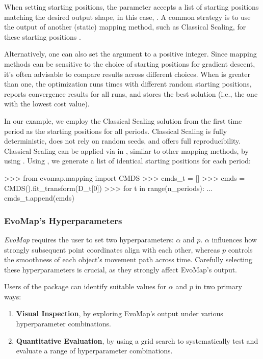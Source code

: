 \documentclass[article]{jss}
\begin{document}
When setting starting positions, the  parameter accepts a list of starting positions matching
 the desired output shape, in this case, . A common strategy is to use the output of 
 another (static) mapping method, such as Classical Scaling, for these starting positions \citep{DeLeeuw+Mair:2009}.

Alternatively, one can also set the  argument to a positive integer. Since mapping methods 
can be sensitive to the choice of starting positions for gradient descent, it's often advisable to compare results
across different choices. When  is greater than one, the optimization runs  times with 
different random starting positions, reports convergence results for all runs, and stores the best solution 
(i.e., the one with the lowest cost value).

In our example, we employ the Classical Scaling solution from the first time period as the starting positions for all 
periods. Classical Scaling is fully deterministic, does not rely on random seeds, and offers full reproducibility. 
Classical Scaling can be applied via  in , similar to other 
mapping methods, by using . Using , we generate a list of identical starting positions 
for each period:

\begin{CodeChunk}
\begin{CodeInput}
>>> from evomap.mapping import CMDS
>>> cmds_t = []
>>> cmds = CMDS().fit_transform(D_t[0])
>>> for t in range(n_periods):
...     cmds_t.append(cmds)
\end{CodeInput}
\end{CodeChunk}

\subsubsection{EvoMap's Hyperparameters}

\emph{EvoMap} requires the user to set two hyperparameters: $\alpha$ and $p$. 
$\alpha$ influences how strongly subsequent point coordinates align with each other, 
whereas $p$ controls the smoothness of each object's movement path across time. Carefully selecting
these hyperparameters is crucial, as they strongly affect EvoMap's output. 

Users of the  package can identify suitable values for $\alpha$ and $p$ in two primary ways: 

\begin{enumerate}
  \item \textbf{Visual Inspection}, by exploring EvoMap's output under various hyperparameter combinations. 
  \item \textbf{Quantitative Evaluation}, by using a grid search to systematically test and evaluate a range of %
  hyperparameter combinations.
\end{enumerate}
\end{document}
